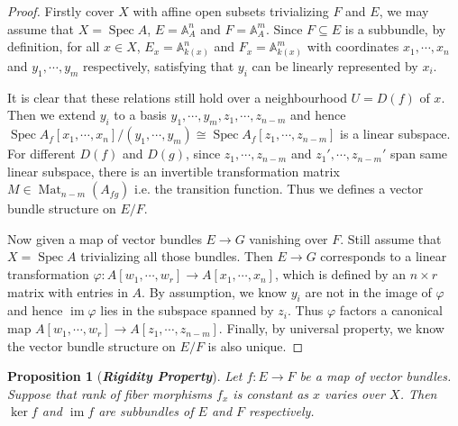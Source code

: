 \documentclass{ctexart}
\newtheorem{proposition}{Proposition}[section]
\newcommand{\im}{\operatorname{im}}
\newcommand{\spec}{\operatorname{Spec}}
\newcommand{\matrices}[2]{\operatorname{Mat}_{#1}(#2)}
\begin{document}
\begin{proof}
    Firstly cover $X$ with affine open subsets trivializing $F$ and $E$, we may assume that $X = \spec A$, $E = \mathbb{A}_{A}^{n}$ and $F = \mathbb{A}_{A}^{m}$.
    Since $F \subseteq E$ is a subbundle, by definition, for all $x\in X$,
    $E_{x} = \mathbb{A}_{k(x)}^{n}$ and $F_{x} = \mathbb{A}_{k(x)}^{m}$ with coordinates $x_{1}, \cdots, x_{n}$ and $y_{1}, \cdots, y_{m}$ respectively,
    satisfying that $y_{i}$ can be linearly represented by $x_{i}$.
    \par
    It is clear that these relations still hold over a neighbourhood $U = D(f)$ of $x$.
    Then we extend $y_{i}$ to a basis $y_{1}, \cdots, y_{m}, z_{1}, \cdots, z_{n - m}$ and hence $\spec A_{f}[x_{1}, \cdots, x_{n}]/(y_{1}, \cdots, y_{m}) \cong \spec A_{f}[z_{1}, \cdots, z_{n - m}]$ is a linear subspace.
    For different $D(f)$ and $D(g)$, since $z_{1}, \cdots, z_{n - m}$ and $z_{1}', \cdots, z_{n - m}'$ span same linear subspace,
    there is an invertible transformation matrix $M\in \matrices{n - m}{A_{fg}}$ i.e. the transition function.
    Thus we defines a vector bundle structure on $E/F$.
    \par
    Now given a map of vector bundles $E \rightarrow G$ vanishing over $F$.
    Still assume that $X = \spec A$ trivializing all those bundles.
    Then $E \rightarrow G$ corresponds to a linear transformation $\varphi: A[w_{1}, \cdots, w_{r}] \rightarrow A[x_{1}, \cdots, x_{n}]$,
    which is defined by an $n \times r$ matrix with entries in $A$.
    By assumption, we know $y_{i}$ are not in the image of $\varphi$ and hence $\im \varphi$ lies in the subspace spanned by $z_{i}$.
    Thus $\varphi$ factors a canonical map $A[w_{1}, \cdots, w_{r}] \rightarrow A[z_{1}, \cdots, z_{n - m}]$.
    Finally, by universal property, we know the vector bundle structure on $E/F$ is also unique.
\end{proof}
\begin{proposition}[\textbf{\emph{Rigidity Property}}]
    Let $f: E \rightarrow F$ be a map of vector bundles.
    Suppose that rank of fiber morphisms $f_{x}$ is constant as $x$ varies over $X$.
    Then $\ker f$ and $\im f$ are subbundles of $E$ and $F$ respectively.
    \label{Proposition 1.13}
\end{proposition}
\end{document}
